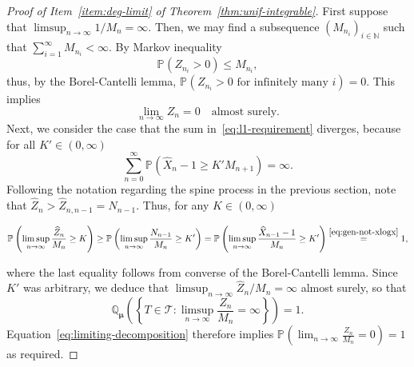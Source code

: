 \documentclass[12pt]{article}
\theoremstyle{definition}
\newcommand{\Prob}[2][]{\ensuremath{\mathbb{P}_{#1} \left(#2 \right)}}
\newcommand{\Probtwo}[2][]{\ensuremath{\mathbb{Q}_{#1} \left(#2 \right)}}
\begin{document}
\begin{proof}[Proof of Item~\ref{item:deg-limit} of Theorem~\ref{thm:unif-integrable}]
First suppose that $\limsup_{n \to \infty} 1 / M_{n} = \infty$. Then, we may find a subsequence $(M_{n_{i}})_{i \in \mathbb{N}}$ such that $\sum_{i=1}^{\infty} M_{n_i} < \infty$. By Markov inequality 
\[
\Prob{Z_{n_i} > 0} \leq M_{n_i},
\]
thus, by the Borel-Cantelli lemma, $\Prob{Z_{n_i} > 0 \text{ for infinitely many $i$}} = 0$. This implies \[\lim_{n \to \infty} Z_{n} = 0 \quad  \text{almost surely}.\] 
Next, we consider the case that the sum in~\eqref{eq:l1-requirement} diverges, because for all $K' \in (0, \infty)$
\begin{equation} \label{eq:gen-not-xlogx}
\sum_{n=0}^{\infty} \Prob{\widehat{X}_{n} - 1\geq K' M_{n+1}} = \infty. 
\end{equation}
Following the notation regarding the spine process in the previous section, note that $\widehat{Z}_{n} > \widehat{Z}_{n,n-1} = N_{n-1}$. Thus, for any $K \in (0,\infty)$
\begin{linenomath}
\begin{align*}
    \Prob{\limsup_{n \to \infty} \frac{\widehat{Z}_n}{M_{n}} \geq K } \geq \Prob{\limsup_{n \to \infty} \frac{N_{n-1}}{M_{n}} \geq K'} = \Prob{\limsup_{n \to \infty} \frac{\widehat{X}_{n-1} - 1}{M_{n}} \geq K'} \stackrel{\eqref{eq:gen-not-xlogx}}{=} 1,
 \end{align*}
\end{linenomath}
where the last equality follows from converse of the Borel-Cantelli lemma. Since $K'$ was arbitrary, we deduce that $\limsup_{n \to \infty} \widehat{Z}_n/{M_{n}} = \infty$ almost surely, so that 
\[
\Probtwo[\boldsymbol{\mu}]{\left\{T \in \mathscr{T}\colon \limsup_{n \to \infty} \frac{Z_{n}}{M_{n}} = \infty\right\}} = 1. 
\]
Equation~\eqref{eq:limiting-decomposition} therefore implies $\Prob{\lim_{n \to \infty} \frac{Z_{n}}{M_{n}} = 0} = 1$ as required.


\end{proof}
\end{document}
